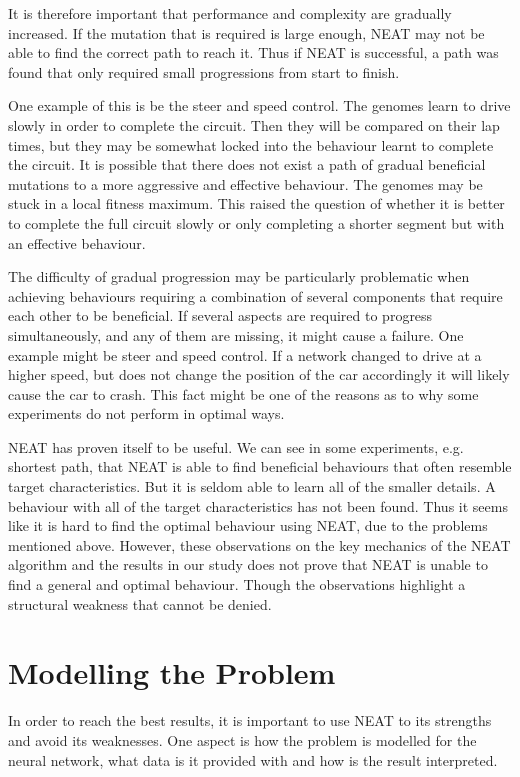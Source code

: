 It is therefore important that performance and complexity are gradually increased. If the mutation that is required is large enough, NEAT may not be able to find the correct path to reach it. Thus if NEAT is successful, a path was found that only required small progressions from start to finish.

One example of this is be the steer and speed control. The genomes learn to drive slowly in order to complete the circuit. Then they will be compared on their lap times, but they may be somewhat locked into the behaviour learnt to complete the circuit. It is possible that there does not exist a path of gradual beneficial mutations to a more aggressive and effective behaviour. The genomes may be stuck in a local fitness maximum. This raised the question of whether it is better to complete the full circuit slowly or only completing a shorter segment but with an effective behaviour.

The difficulty of gradual progression may be particularly problematic when achieving behaviours requiring a combination of several components that require each other to be beneficial. If several aspects are required to progress simultaneously, and any of them are missing, it might cause a failure. One example might be steer and speed control. If a network changed to drive at a higher speed, but does not change the position of the car accordingly it will likely cause the car to crash. This fact might be one of the reasons as to why some experiments do not perform in optimal ways.

NEAT has proven itself to be useful. We can see in some experiments, e.g. shortest path, that NEAT is able to find beneficial behaviours that often resemble target characteristics. But it is seldom able to learn all of the smaller details. A behaviour with all of the target characteristics has not been found. Thus it seems like it is hard to find the optimal behaviour using NEAT, due to the problems mentioned above. However, these observations on the key mechanics of the NEAT algorithm and the results in our study does not prove that NEAT is unable to find a general and optimal behaviour. Though the observations highlight a structural weakness that cannot be denied. 

\section{Modelling the Problem}

In order to reach the best results, it is important to use NEAT to its strengths and avoid its weaknesses. One aspect is how the problem is modelled for the neural network, what data is it provided with and how is the result interpreted.

